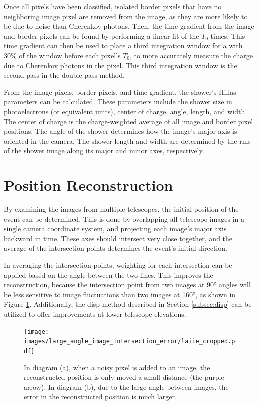   Once all pixels have been classified, isolated border pixels that have no neighboring image pixel are removed from the image, as they are more likely to be due to noise than Cherenkov photons.
  Then, the time gradient from the image and border pixels can be found by performing a linear fit of the $T_{0}$ times.
  This time gradient can then be used to place a third integration window for a 
with 30\% of the window before each pixel's $T_{0}$, to more accurately measure the charge due to Cherenkov photons in the pixel.
  This third integration window is the second pass in the double-pass method.

  From the image pixels, border pixels, and time gradient, the shower's Hillas parameters \cite{hillas_params} can be calculated.
  These parameters include the shower size in photoelectrons (or equivalent units), center of charge, angle, length, and width.
  The center of charge is the charge-weighted average of all image and border pixel positions.
  The angle of the shower determines how the image's major axis is oriented in the camera.
  The shower length and width are determined by the rms of the shower image along its major and minor axes, respectively.

\section{Position Reconstruction}\label{subsec:posrecon}
  By examining the images from multiple telescopes, the initial position of the event can be determined.
  This is done by overlapping all telescope images in a single camera coordinate system, and projecting each image's major axis backward in time.
  These axes should intersect very close together, and the average of the intersection points determines the event's initial direction.

  In averaging the intersection points, weighting for each intersection can be applied based on the angle between the two lines.
  This improves the reconstruction, because the intersection point from two images at \ang{90} angles will be less sensitive to image fluctuations than two images at \ang{160}, as shown in Figure \ref{fig:largeintersectangle}.
  Additionally, the disp method described in Section \ref{subsec:disp} can be utilized to offer improvements at lower telescope elevations.

  \begin{figure}[ht]
    \centering
    \texttt{[image: images/large\_angle\_image\_intersection\_error/laiie\_cropped.pdf]}
    \caption[Large Image Intersection Angles]{
      In diagram (a), when a noisy pixel is added to an image, the reconstructed position is only moved a small distance (the purple arrow).
      In diagram (b), due to the large angle between images, the error in the reconstructed position is much larger.
    }
    \label{fig:largeintersectangle}
  \end{figure}
  \FloatBarrier

